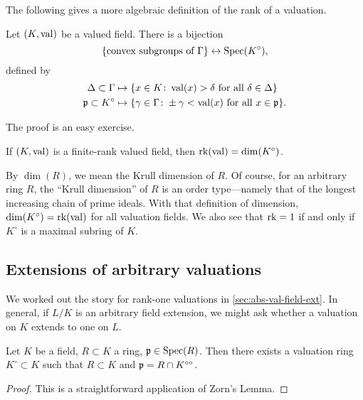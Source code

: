 The following gives a more algebraic definition of the rank of a valuation. 

\begin{theorem}
Let $(K,\operatorname{val})$ be a valued field. There is a bijection 
\[
  \{\text{convex subgroups of $\Gamma$}\} \leftrightarrow \operatorname{Spec}(K^\circ) ,
\]
defined by 
\begin{align*}
  \Delta\subset\Gamma &\mapsto \{x\in K\colon \operatorname{val}(x)>\delta\text{ for all }\delta\in \Delta\} \\
  \mathfrak{p}\subset K^\circ &\mapsto \{\gamma\in\Gamma\colon \pm\gamma<\operatorname{val}(x)\text{ for all }x\in \mathfrak{p}\} .
\end{align*}
\end{theorem}

The proof is an easy exercise. 

\begin{corollary}
If $(K,\operatorname{val})$ is a finite-rank valued field, then 
$\operatorname{rk}(\operatorname{val})=\dim(K^\circ)$. 
\end{corollary}

By $\dim(R)$, we mean the Krull dimension of $R$. Of course, for an arbitrary 
ring $R$, the ``Krull dimension'' of $R$ is an order type---namely that of the 
longest increasing chain of prime ideals. With that definition of dimension, 
$\dim(K^\circ)=\operatorname{rk}(\operatorname{val})$ for all valuation fields. We also see that 
$\operatorname{rk}=1$ if and only if $K^\circ$ is a maximal subring of $K$. 





\subsection{Extensions of arbitrary valuations}

We worked out the story for rank-one valuations in 
\autoref{sec:abs-val-field-ext}. In general, if $L/K$ is an arbitrary field 
extension, we might ask whether a valuation on $K$ extends to one on $L$. 

\begin{theorem}[Chevalley]\label{thm:chevalley-extend-valuation}
Let $K$ be a field, $R\subset K$ a ring, $\mathfrak{p}\in \operatorname{Spec}(R)$. Then there exists a 
valuation ring $K^\circ\subset K$ such that $R\subset K$ and 
$\mathfrak{p}=R\cap K^{\circ\circ}$. 
\end{theorem}
\begin{proof}
This is a straightforward application of Zorn's Lemma.
\end{proof}


